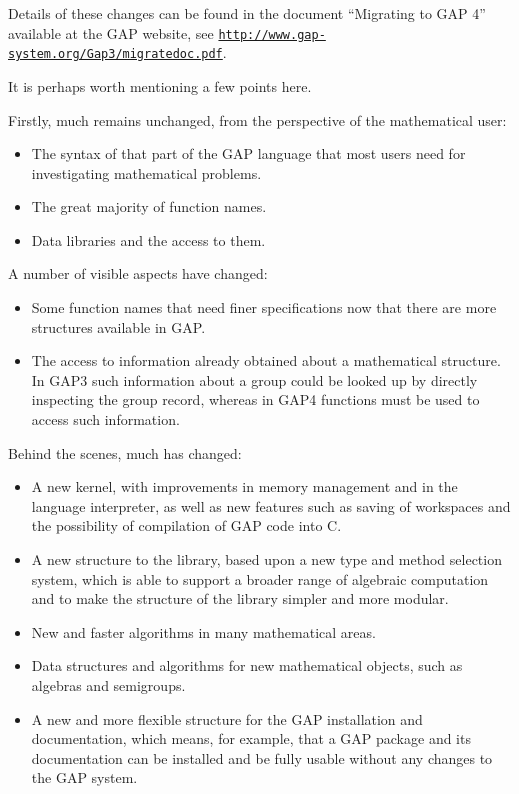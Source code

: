 \documentclass[a4paper,11pt]{report}
\begin{document}
{{ Details of these changes can be found in the document ``Migrating to GAP 4'' available at the \textsf{GAP} website, see \href{http://www.gap-system.org/Gap3/migratedoc.pdf} {\texttt{http://www.gap-system.org/Gap3/migratedoc.pdf}}. 

 It is perhaps worth mentioning a few points here. 

 Firstly, much remains unchanged, from the perspective of the mathematical
user: 

 
\begin{itemize}
\item  The syntax of that part of the \textsf{GAP} language that most users need for investigating mathematical problems. 

 
\item  The great majority of function names. 

 
\item  Data libraries and the access to them. 
\end{itemize}
 

 A number of visible aspects have changed: 

 
\begin{itemize}
\item  Some function names that need finer specifications now that there are more
structures available in \textsf{GAP}. 
\item  The access to information already obtained about a mathematical structure. In \textsf{GAP}{\nobreakspace}3 such information about a group could be looked up by directly
inspecting the group record, whereas in \textsf{GAP}{\nobreakspace}4 functions must be used to access such information. 
\end{itemize}
 

 Behind the scenes, much has changed: 

 
\begin{itemize}
\item  A new kernel, with improvements in memory management and in the language
interpreter, as well as new features such as saving of workspaces and the
possibility of compilation of \textsf{GAP} code into C. 
\item  A new structure to the library, based upon a new type and method selection
system, which is able to support a broader range of algebraic computation and
to make the structure of the library simpler and more modular. 
\item  New and faster algorithms in many mathematical areas. 
\item  Data structures and algorithms for new mathematical objects, such as algebras
and semigroups. 
\item  A new and more flexible structure for the \textsf{GAP} installation and documentation, which means, for example, that a \textsf{GAP} package and its documentation can be installed and be fully usable without any
changes to the \textsf{GAP} system. 
\end{itemize}
 

}}
\end{document}
